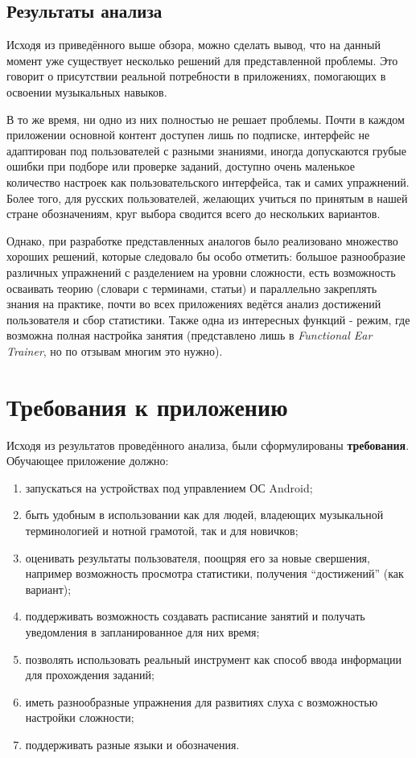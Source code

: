 \subsection{Результаты анализа}
Исходя из приведённого выше обзора, можно сделать вывод, что на данный момент уже существует несколько решений для представленной проблемы. Это говорит о присутствии реальной потребности в приложениях, помогающих в освоении музыкальных навыков.\par
В то же время, ни одно из них полностью не решает проблемы. Почти в каждом приложении основной контент доступен лишь по подписке, интерфейс не адаптирован под пользователей с разными знаниями, иногда допускаются грубые ошибки при подборе или проверке заданий, доступно очень маленькое количество настроек как пользовательского интерфейса, так и самих упражнений. Более того, для русских пользователей, желающих учиться по принятым в нашей стране обозначениям, круг выбора сводится всего до нескольких вариантов.\par
Однако, при разработке представленных аналогов было реализовано множество хороших решений, которые следовало бы особо отметить: большое разнообразие различных упражнений с разделением на уровни сложности, есть возможность осваивать теорию (словари с терминами, статьи) и параллельно закреплять знания на практике, почти во всех приложениях ведётся анализ достижений пользователя и сбор статистики. Также одна из интересных функций - режим, где возможна полная настройка занятия (представлено лишь в \textit{Functional Ear Trainer}, но по отзывам многим это нужно).
\section{Требования к приложению}
Исходя из результатов проведённого анализа, были сформулированы \textbf{требования}. Обучающее приложение должно: 
\begin{enumerate}
\item запускаться на устройствах под управлением ОС Android;
\item быть удобным в использовании как для людей, владеющих музыкальной терминологией и нотной грамотой, так и для новичков;
\item оценивать результаты пользователя, поощряя его за новые свершения, например возможность просмотра статистики, получения “достижений” (как вариант);
\item поддерживать возможность создавать расписание занятий и получать уведомления в запланированное для них время;
\item позволять использовать реальный инструмент как способ ввода информации для прохождения заданий;
\item иметь разнообразные упражнения для развитиях слуха с возможностью настройки сложности;
\item поддерживать разные языки и обозначения.
\end{enumerate}\par
